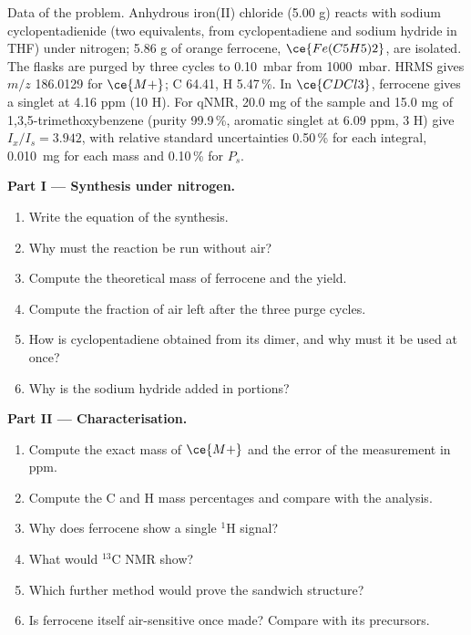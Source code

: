 \begin{problem}
\label{pb:b3:lab-techniques-3:1}
Data of the problem. Anhydrous iron(II) chloride (5.00 g) reacts with sodium
cyclopentadienide (two equivalents, from cyclopentadiene and sodium hydride in
THF) under nitrogen; 5.86 g of orange ferrocene, $\ce{Fe(C5H5)2}$, are isolated. The flasks are
purged by three cycles to \qty{0.10}{mbar} from \qty{1000}{mbar}. HRMS gives $m/z$ 186.0129 for $\ce{M+}$;  C 64.41, H 5.47\,\%. In $\ce{CDCl3}$, ferrocene gives a singlet at 4.16 ppm (10 H). For qNMR,
20.0 mg of the sample and 15.0 mg of 1,3,5-trimethoxybenzene (purity 99.9\,\%, aromatic
singlet at 6.09 ppm, 3 H) give $I_x/I_s = 3.942$, with relative standard uncertainties 0.50\,\% for each
integral, \qty{0.010}{mg} for each mass and 0.10\,\% for $P_s$.

\medskip\noindent\textbf{Part I --- Synthesis under nitrogen.}
\begin{enumerate}
  \item Write the equation of the synthesis.
  \item Why must the reaction be run without air?
  \item Compute the theoretical mass of ferrocene and the yield.
  \item Compute the fraction of air left after the three purge cycles.
  \item How is cyclopentadiene obtained from its dimer, and why must it be used at once?
  \item Why is the sodium hydride added in portions?
\end{enumerate}

\medskip\noindent\textbf{Part II --- Characterisation.}
\begin{enumerate}[resume]
  \item Compute the exact mass of $\ce{M+}$ and the error of the measurement in ppm.
  \item Compute the C and H mass percentages and compare with the analysis.
  \item Why does ferrocene show a single $^1$H signal?
  \item What would $^{13}$C NMR show?
  \item Which further method would prove the sandwich structure?
  \item Is ferrocene itself air-sensitive once made? Compare with its precursors.
\end{enumerate}


\end{problem}
